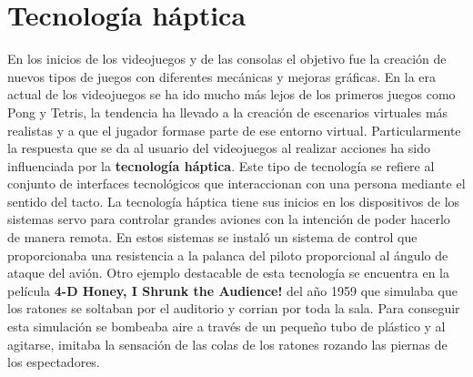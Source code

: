 \section{Tecnolog\'ia h\'aptica}

En los inicios de los videojuegos y de las consolas el objetivo fue la creaci\'on de nuevos tipos de juegos con diferentes mec\'anicas y mejoras gr\'aficas. En la era actual de los videojuegos se ha ido mucho m\'as lejos de los primeros juegos como Pong y Tetris, la tendencia ha llevado a la creaci\'on de escenarios virtuales m\'as realistas y a que el jugador formase parte de ese entorno virtual. Particularmente la respuesta que se da al usuario del videojuegos al realizar acciones ha sido influenciada por la \textbf{tecnolog\'ia h\'aptica}. Este tipo de tecnolog\'ia se refiere al conjunto de interfaces tecnol\'ogicos que interaccionan con una persona mediante el sentido del tacto. La tecnolog\'ia h\'aptica tiene sus inicios en los dispositivos de los sistemas servo para controlar grandes aviones con la intenci\'on de poder hacerlo de manera remota. En estos sistemas se instal\'o un sistema de control que proporcionaba una resistencia a la palanca del piloto proporcional al \'angulo de ataque del avi\'on. Otro ejemplo destacable de esta tecnolog\'ia se encuentra en la pel\'icula \textbf{4-D Honey, I Shrunk the Audience!} del a\~no 1959 que simulaba que los ratones se soltaban por el auditorio y corrian por toda la sala. Para conseguir esta simulaci\'on se bombeaba aire a trav\'es de un peque\~no tubo de pl\'astico y al agitarse, imitaba la sensaci\'on de las colas de los ratones rozando las piernas de los espectadores. \par

